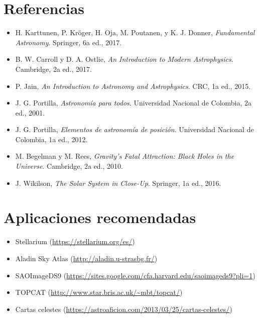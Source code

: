 \documentclass[12pt]{article}
\begin{document}
\section*{Referencias}
\begin{itemize}
    \item H. Karttunen, P. Kröger, H. Oja, M. Poutanen, y K. J. Donner, \textit{Fundamental Astronomy}. Springer, 6a ed., 2017.
    \item B. W. Carroll y D. A. Ostlie, \textit{An Introduction to Modern Astrophysics}. Cambridge, 2a ed., 2017.
    \item P. Jain, \textit{An Introduction to Astronomy and Astrophysics}. CRC, 1a ed., 2015.
    \item J. G. Portilla, \textit{Astronomía para todos}. Universidad Nacional de Colombia, 2a ed., 2001.
    \item J. G. Portilla, \textit{Elementos de astronomía de posición}. Universidad Nacional de Colombia, 1a ed., 2012.
    \item M. Begelman y M. Rees, \textit{Gravity’s Fatal Attraction: Black Holes in the Universe}. Cambridge, 2a ed., 2010.
    \item J. Wikilson, \textit{The Solar System in Close-Up}. Springer, 1a ed., 2016.
\end{itemize}

\section*{Aplicaciones recomendadas}
\begin{itemize}
    \item Stellarium (\url{https://stellarium.org/es/})
    \item Aladin Sky Atlas (\url{http://aladin.u-strasbg.fr/})
    \item SAOImageDS9 (\url{https://sites.google.com/cfa.harvard.edu/saoimageds9?pli=1})
    \item TOPCAT (\url{http://www.star.bris.ac.uk/~mbt/topcat/})
    \item Cartas celestes (\url{https://astroaficion.com/2013/03/25/cartas-celestes/})
\end{itemize}
\end{document}
